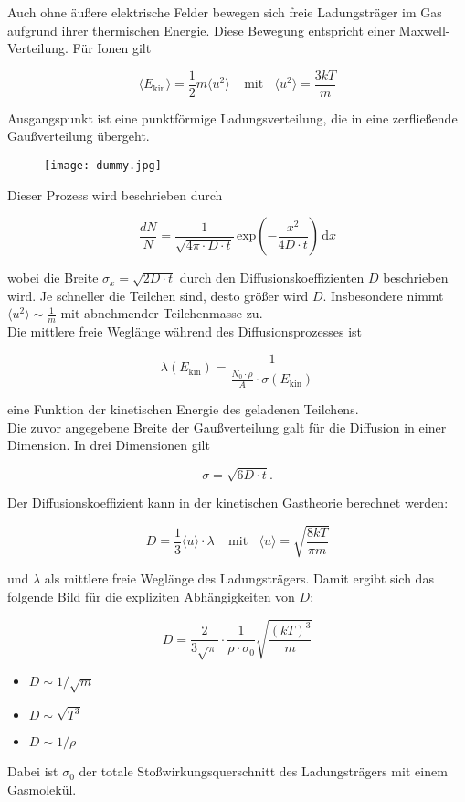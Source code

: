 Auch ohne äußere elektrische Felder bewegen sich freie Ladungsträger im Gas aufgrund ihrer
thermischen Energie. Diese Bewegung entspricht einer Maxwell-Verteilung. Für Ionen gilt

\[\langle E_{\text{kin}} \rangle = \frac{1}{2} m \langle u^2 \rangle ~~~~~\text{mit}~~~~ \langle u^2
\rangle = \frac{3kT}{m}
\]

Ausgangspunkt ist eine punktförmige Ladungsverteilung, die in eine zerfließende Gaußverteilung
übergeht.

\begin{figure}[H]
	\centering
	\texttt{[image: dummy.jpg]}
\end{figure}

Dieser Prozess wird beschrieben durch

\[\frac{dN}{N} = \frac{1}{\sqrt{4\pi\cdot D\cdot t}}\, \text{exp}\left(-\frac{x^2}{4D\cdot
t}\right)\,\mathrm{d}x
\]

wobei die Breite $\sigma_x=\sqrt{2D\cdot t}$ durch den Diffusionskoeffizienten $D$ beschrieben wird.
Je schneller die Teilchen sind, desto größer wird $D$. Insbesondere nimmt $\langle u^2 \rangle \sim
\frac{1}{m}$ mit abnehmender Teilchenmasse zu.
\\
Die mittlere freie Weglänge während des Diffusionsprozesses ist 

\[\lambda(E_{\text{kin}}) = \frac{1}{\frac{N_0\cdot\rho}{A}\cdot \sigma(E_{\text{kin}})} \]

eine Funktion der kinetischen Energie des geladenen Teilchens.
\\
Die zuvor angegebene Breite der Gaußverteilung galt für die Diffusion in einer Dimension. In drei
Dimensionen gilt

\[\sigma = \sqrt{6D\cdot t} . \]

Der Diffusionskoeffizient kann in der kinetischen Gastheorie berechnet werden:

\[D=\frac{1}{3} \langle u \rangle \cdot \lambda~~~~~\text{mit}~~~~\langle u \rangle
=\sqrt{\frac{8kT}{\pi m}}\]

und $\lambda$ als mittlere freie Weglänge des Ladungsträgers. Damit ergibt sich das folgende Bild
für die expliziten Abhängigkeiten von $D$:

\[ D= \frac{2}{3\sqrt{\pi}}\cdot \frac{1}{\rho\cdot\sigma_0}\sqrt{\frac{(kT)^3}{m}} \]

\begin{itemize}
  \item $D\sim 1/\sqrt{m}$
  \item $D\sim \sqrt{T^3}$
  \item $D\sim 1/\rho$
\end{itemize}

Dabei ist $\sigma_0$ der totale Stoßwirkungsquerschnitt des Ladungsträgers mit einem Gasmolekül.
